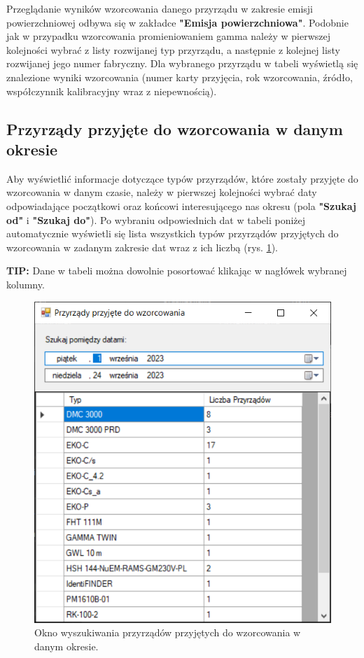 Przeglądanie wyników wzorcowania danego przyrządu w zakresie emisji powierzchniowej odbywa się w zakładce \textbf{"Emisja powierzchniowa"}. Podobnie jak w przypadku wzorcowania promieniowaniem gamma należy w pierwszej kolejności wybrać z listy rozwijanej typ przyrządu, a następnie z kolejnej listy rozwijanej jego numer fabryczny. Dla wybranego przyrządu w tabeli wyświetlą się znalezione wyniki wzorcowania (numer karty przyjęcia, rok wzorcowania, źródło, współczynnik kalibracyjny wraz z niepewnością).

\subsection{Przyrządy przyjęte do wzorcowania w danym okresie}
\label{przyrzady_przyjete}

Aby wyświetlić informacje dotyczące typów przyrządów, które zostały przyjęte do wzorcowania w danym czasie, należy w pierwszej kolejności wybrać daty odpowiadające początkowi oraz końcowi interesującego nas okresu (pola \textbf{"Szukaj od"} i \textbf{"Szukaj do"}). Po wybraniu odpowiednich dat w tabeli poniżej automatycznie wyświetli się lista wszystkich typów przyrządów przyjętych do wzorcowania w zadanym zakresie dat wraz z ich liczbą  (rys. \ref{przyrzadyPrzyjete}).

\textbf{TIP:} Dane w tabeli można dowolnie posortować klikając w nagłówek wybranej kolumny.

\begin{figure}[htb]
	\centering
	\includegraphics{obrazki/Wyszukiwanie/przyrzady_przyjete.png}
	\caption{Okno wyszukiwania przyrządów przyjętych do wzorcowania w danym okresie.}
	\label{przyrzadyPrzyjete}
\end{figure}

